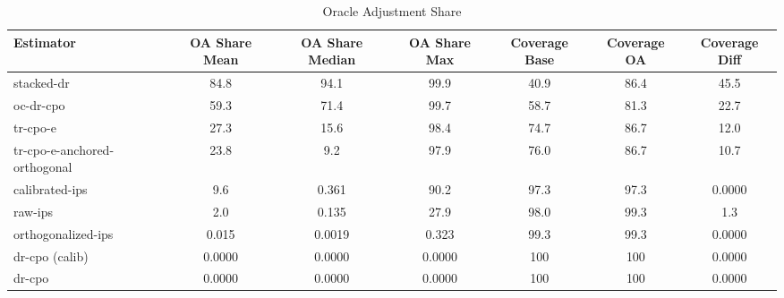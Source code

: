 \begin{table}[htbp]
\centering
\caption{Oracle Adjustment Share}
\label{tab:A4}
\begin{tabular}{l|cccccc}
\toprule
Estimator & OA Share Mean & OA Share Median & OA Share Max & Coverage Base & Coverage OA & Coverage Diff \\
\midrule
stacked-dr & 84.8 & 94.1 & 99.9 & 40.9 & 86.4 & 45.5 \\
oc-dr-cpo & 59.3 & 71.4 & 99.7 & 58.7 & 81.3 & 22.7 \\
tr-cpo-e & 27.3 & 15.6 & 98.4 & 74.7 & 86.7 & 12.0 \\
tr-cpo-e-anchored-orthogonal & 23.8 & 9.2 & 97.9 & 76.0 & 86.7 & 10.7 \\
calibrated-ips & 9.6 & 0.361 & 90.2 & 97.3 & 97.3 & 0.0000 \\
raw-ips & 2.0 & 0.135 & 27.9 & 98.0 & 99.3 & 1.3 \\
orthogonalized-ips & 0.015 & 0.0019 & 0.323 & 99.3 & 99.3 & 0.0000 \\
dr-cpo (calib) & 0.0000 & 0.0000 & 0.0000 & 100 & 100 & 0.0000 \\
dr-cpo & 0.0000 & 0.0000 & 0.0000 & 100 & 100 & 0.0000 \\
\bottomrule
\end{tabular}
\end{table}
